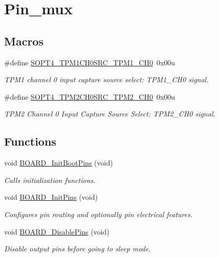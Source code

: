 \hypertarget{group__pin__mux}{}\section{Pin\+\_\+mux}
\label{group__pin__mux}
\subsection*{Macros}
\begin{DoxyCompactItemize}
\item 
\mbox{\label{group__pin__mux_gafe84c0554cf1aac1a55b2ff9a0b80fa3}} 
\#define \mbox{\hyperlink{group__pin__mux_gafe84c0554cf1aac1a55b2ff9a0b80fa3}{S\+O\+P\+T4\+\_\+\+T\+P\+M1\+C\+H0\+S\+R\+C\+\_\+\+T\+P\+M1\+\_\+\+C\+H0}}~0x00u
\begin{DoxyCompactList}\small\item\em T\+P\+M1 channel 0 input capture source select\+: T\+P\+M1\+\_\+\+C\+H0 signal. \end{DoxyCompactList}\item 
\mbox{\label{group__pin__mux_ga55543c830d60f930f9231ce0c7f48925}} 
\#define \mbox{\hyperlink{group__pin__mux_ga55543c830d60f930f9231ce0c7f48925}{S\+O\+P\+T4\+\_\+\+T\+P\+M2\+C\+H0\+S\+R\+C\+\_\+\+T\+P\+M2\+\_\+\+C\+H0}}~0x00u
\begin{DoxyCompactList}\small\item\em T\+P\+M2 Channel 0 Input Capture Source Select\+: T\+P\+M2\+\_\+\+C\+H0 signal. \end{DoxyCompactList}\end{DoxyCompactItemize}
\subsection*{Functions}
\begin{DoxyCompactItemize}
\item 
void \mbox{\hyperlink{group__pin__mux_ga8652eb15efb9dfe7368dd7f292dab554}{B\+O\+A\+R\+D\+\_\+\+Init\+Boot\+Pins}} (void)
\begin{DoxyCompactList}\small\item\em Calls initialization functions. \end{DoxyCompactList}\item 
void \mbox{\hyperlink{group__pin__mux_ga2c9fe54b6b84723fbaa590a6f4576966}{B\+O\+A\+R\+D\+\_\+\+Init\+Pins}} (void)
\begin{DoxyCompactList}\small\item\em Configures pin routing and optionally pin electrical features. \end{DoxyCompactList}\item 
void \mbox{\hyperlink{group__pin__mux_ga18145d0a226cc9ba105372695e8ade79}{B\+O\+A\+R\+D\+\_\+\+Disable\+Pins}} (void)
\begin{DoxyCompactList}\small\item\em Disable output pins before going to sleep mode. \end{DoxyCompactList}\end{DoxyCompactItemize}
